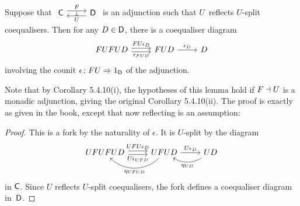 \documentclass[../../solutions]{subfiles}
\begin{document}
\begin{lemma}
  \label{lemma:5.4.11}%
  Suppose that
  $\begin{tikzcd}\sC
    \ar[r, shift left=0.7ex, "F"]
    \ar[r, shift right=0.7ex, leftarrow, "U"']
    \ar[r, phantom, "\scriptstyle\bot"]
    & \sD
  \end{tikzcd}$ is an adjunction such that $U$~reflects $U$-split
  coequalisers.  Then for any $D\in{\mathsf{D}}$, there is a coequaliser
  diagram
  $$
  \begin{tikzcd}
    FUFUD
    \ar[r, shift left=0.5ex, "FU\epsilon_D"]
    \ar[r, shift right=0.5ex, "\epsilon_{FUD}"']
    & FUD
    \ar[r, "\epsilon_D"]
    & D
  \end{tikzcd}
  $$
  involving the counit ${\epsilon}\colon{FU}\Rightarrow{1_{\mathsf{D}}}$ of the
  adjunction.
\end{lemma}
\popthm

Note that by Corollary 5.4.10(i), the hypotheses of this lemma hold if
$F\dashv U$ is a monadic adjunction, giving the original Corollary
5.4.10(ii).  The proof is exactly as given in the book, except that
now reflecting is an assumption:

\begin{proof}[Proof]
  This is a fork by the naturality of $\epsilon$.  It is $U$-split by
  the diagram
  $$
  \begin{tikzcd}
    UFUFUD
    \ar[r, shift left=0.5ex, "UFU\epsilon_D"]
    \ar[r, shift right=0.5ex, "U\epsilon_{UFD}"']
    & UFUD \ar[r, "U\epsilon_D"]
    \ar[bend left=45]{l}{\eta_{UFUD}}
    & UD
    \ar[bend left]{l}{\eta_{UD}}
  \end{tikzcd}
  $$
  in ${\mathsf{C}}$.  Since $U$ reflects $U$-split coequalisers, the fork
  defines a coequaliser diagram in~${\mathsf{D}}$.
\end{proof}
\end{document}
